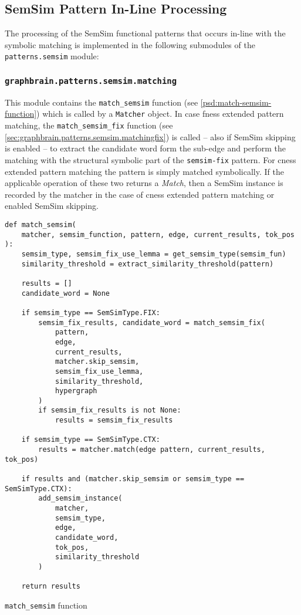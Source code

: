\documentclass[11pt]{scrreprt}
\begin{document}
\subsection{SemSim Pattern In-Line Processing}
The processing of the SemSim functional patterns that occurs in-line with the symbolic matching is implemented in the following submodules of the \texttt{patterns.semsim} module:


\subsubsection{\texttt{graphbrain.patterns.semsim.matching}}
This module contains the \texttt{match\_semsim} function (see \cref{psd:match-semsim-function}) which is called by a \texttt{Matcher} object. In case \gls{fness} extended pattern matching, the \texttt{match\_semsim\_fix} function (see \cref{sec:graphbrain.patterns.semsim.matchingfix}) is called -- also if SemSim skipping is enabled -- to extract the candidate word form the sub-edge and perform the matching with the structural symbolic part of the \texttt{semsim-fix} pattern. For \gls{cness} extended pattern matching the pattern is simply matched symbolically. If the applicable operation of these two returns a \textit{Match}, then a SemSim instance is recorded by the matcher in the case of \gls{cness} extended pattern matching or enabled SemSim skipping.

\begin{pseudo}
\begin{lstlisting}
def match_semsim(
    matcher, semsim_function, pattern, edge, current_results, tok_pos
):
    semsim_type, semsim_fix_use_lemma = get_semsim_type(semsim_fun)
    similarity_threshold = extract_similarity_threshold(pattern)

    results = []
    candidate_word = None   

    if semsim_type == SemSimType.FIX:
        semsim_fix_results, candidate_word = match_semsim_fix(
            pattern,
            edge,
            current_results,
            matcher.skip_semsim,
            semsim_fix_use_lemma,
            similarity_threshold,
            hypergraph
        )
        if semsim_fix_results is not None:
            results = semsim_fix_results

    if semsim_type == SemSimType.CTX:
        results = matcher.match(edge pattern, current_results, tok_pos)

    if results and (matcher.skip_semsim or semsim_type == SemSimType.CTX):
        add_semsim_instance(
            matcher, 
            semsim_type, 
            edge, 
            candidate_word, 
            tok_pos, 
            similarity_threshold
        )

    return results
\end{lstlisting}
\caption{\texttt{match\_semsim} function}
\label{psd:match-semsim-function}
\end{pseudo}
\end{document}
